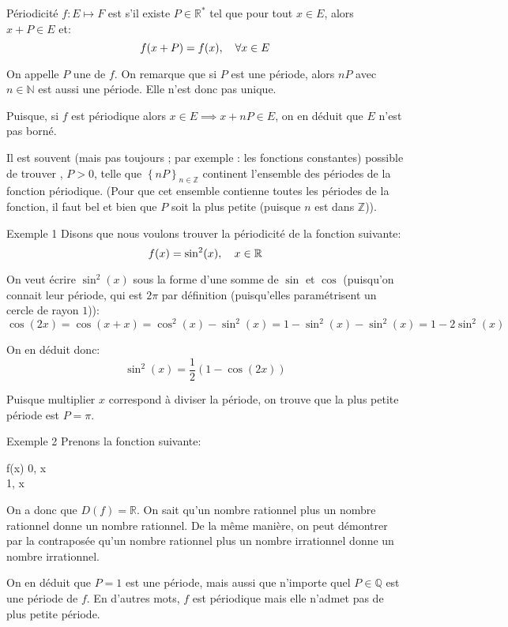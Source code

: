 \documentclass[a4paper]{article}
\begin{document}
\begin{parag}{Périodicité}
$f: E \mapsto F$ est  s'il existe $P \in \mathbb{R}^*$ tel que pour tout $x \in E$, alors $x + P \in E$ et: 
 \[f\left(x + P\right) = f\left(x\right), \mathspace \forall x \in E\]

 On appelle $P$ une  de $f$. On remarque que si $P$ est une période, alors $nP$ avec $n \in \mathbb{N}$ est aussi une période. Elle n'est donc pas unique.

 Puisque, si $f$ est périodique alors $x \in E \implies x + nP \in E$, on en déduit que $E$ n'est pas borné.

 Il est souvent (mais pas toujours ; par exemple : les fonctions constantes) possible de trouver , $P > 0$, telle que $\left\{nP\right\}_{n \in \mathbb{Z}}$ continent l'ensemble des périodes de la fonction périodique. (Pour que cet ensemble contienne toutes les périodes de la fonction, il faut bel et bien que $P$ soit la plus petite (puisque $n$ est dans $\mathbb{Z}$)).
\end{parag}

\begin{parag}{Exemple 1}
    Disons que nous voulons trouver la périodicité de la fonction suivante:
    \[f\left(x\right) = \sin^2\left(x\right), \mathspace x \in \mathbb{R}\]

    On veut écrire $\sin^2\left(x\right)$ sous la forme d'une somme de $\sin$ et $\cos$ (puisqu'on connait leur période, qui est $2\pi$ par définition (puisqu'elles paramétrisent un cercle de rayon $1$)):
    \[\cos\left(2x\right) = \cos\left(x + x\right) = \cos^2\left(x\right) - \sin^2\left(x\right) = 1 - \sin^2\left(x\right) - \sin^2\left(x\right) = 1 - 2\sin^2\left(x\right)\]

    On en déduit donc: 
    \[\sin^2\left(x\right) = \frac{1}{2}\left(1 - \cos\left(2x\right)\right)\]
    
    Puisque multiplier $x$ correspond à diviser la période, on trouve que la plus petite période est $P = \pi$.
\end{parag}

\begin{parag}{Exemple 2}
    Prenons la fonction suivante:
    \begin{functionbypart}{f\left(x\right)}
    0, \mathspace x \in {}  \\
    1, \mathspace x \not\in {}
    \end{functionbypart}

    On a donc que $D\left(f\right) = \mathbb{R}$. On sait qu'un nombre rationnel plus un nombre rationnel donne un nombre rationnel. De la même manière, on peut démontrer par la contraposée qu'un nombre rationnel plus un nombre irrationnel donne un nombre irrationnel. 

    On en déduit que $P = 1$ est une période, mais aussi que n'importe quel $P \in \mathbb{Q}$ est une période de $f$. En d'autres mots, $f$ est périodique mais elle n'admet pas de plus petite période. 

\end{parag}
\end{document}
